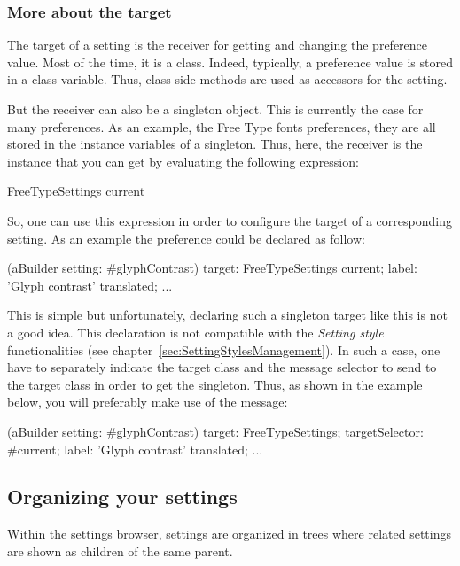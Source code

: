 \documentclass[a4paper,10pt,twoside]{book}
\begin{document}
\subsubsection{More about the target}
The target of a setting is the receiver for getting and changing the preference value. Most of the time, it is a class. Indeed, typically, a preference value is stored in a class variable. Thus, class side methods are used as accessors for the setting. 

But the receiver can also be a singleton object. This is currently the case for many preferences. As an example, the Free Type fonts preferences, they are all stored in the instance variables of a  singleton. Thus, here, the receiver is the  instance that you can get by evaluating the following expression:
\begin{code}{}
FreeTypeSettings current
\end{code}
So, one can use this expression in order to configure the target of a corresponding setting. As an example the  preference could be declared as follow:
\begin{code}{}
(aBuilder setting: #glyphContrast) 
	target: FreeTypeSettings current;
	label: 'Glyph contrast' translated;
...
\end{code}
This is simple but unfortunately, declaring such a singleton target like this is not a good idea. This declaration is not compatible with the \textit{Setting style} functionalities (see chapter~\ref{sec:SettingStylesManagement}). In such a case, one have to separately indicate the target class and the message selector to send to the target class in order to get the singleton. Thus, as shown in the example below, you will preferably make use of the  message:
\begin{code}{}
(aBuilder setting: #glyphContrast) 
	target: FreeTypeSettings;
	targetSelector: #current;
	label: 'Glyph contrast' translated;
...
\end{code}

\subsection{Organizing your settings}

Within the settings browser, settings are organized in trees where related settings are shown as children of the same parent. 
\end{document}
